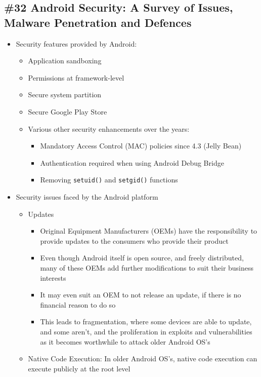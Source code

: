\subsection{\#32 Android Security: A Survey of Issues, Malware Penetration and Defences}
\begin{itemize}
	\item Security features provided by Android:
	\begin{itemize}
		\item Application sandboxing
		\item Permissions at framework-level
		\item Secure system partition
		\item Secure Google Play Store
		\item Various other security enhancements over the years:
		\begin{itemize}
			\item Mandatory Access Control (MAC) policies since 4.3 (Jelly Bean)
			\item Authentication required when using Android Debug Bridge
			\item Removing \texttt{setuid()} and \texttt{setgid()} functions
		\end{itemize}
	\end{itemize}
	\item Security issues faced by the Android platform
	\begin{itemize}
		\item Updates
		\begin{itemize}
			\item Original Equipment Manufacturers (OEMs) have the responsibility to provide updates to the consumers who provide their product
			\item Even though Android itself is open source, and freely distributed, many of these OEMs add further modifications to suit their business interests
			\item It may even suit an OEM to not release an update, if there is no financial reason to do so
			\item This leads to fragmentation, where some devices are able to update, and some aren't, and the proliferation in exploits and vulnerabilities as it becomes worthwhile to attack older Android OS's
		\end{itemize}
		\item Native Code Execution: In older Android OS's, native code execution can execute publicly at the root level

\end{itemize}
\end{itemize}

